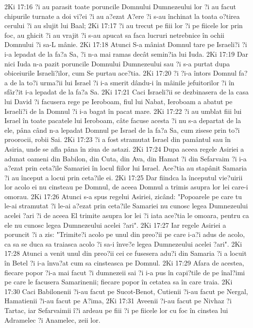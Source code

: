 2Ki 17:16  ?i au parasit toate poruncile Domnului Dumnezeului lor ?i au facut chipurile turnate a doi vi?ei ?i au a?ezat A?ere ?i s-au închinat la toata o?tirea cerului ?i au slujit lui Baal;
2Ki 17:17  ?i au trecut pe fiii lor ?i pe fiicele lor prin foc, au ghicit ?i au vrajit ?i s-au apucat sa faca lucruri netrebnice în ochii Domnului ?i sa-L mânie.
2Ki 17:18  Atunci S-a mâniat Domnul tare pe Israeli?i ?i i-a lepadat de la fa?a Sa, ?i n-a mai ramas decât semin?ia lui Iuda.
2Ki 17:19  Dar nici Iuda n-a pazit poruncile Domnului Dumnezeului sau ?i s-a purtat dupa obiceiurile Israeli?ilor, cum Se purtau ace?tia.
2Ki 17:20  ?i ?i-a întors Domnul fa?a de la to?i urma?ii lui Israel ?i i-a smerit dându-i în mâinile jefuitorilor ?i în sfâr?it i-a lepadat de la fa?a Sa.
2Ki 17:21  Caci Israeli?ii se dezbinasera de la casa lui David ?i facusera rege pe Ieroboam, fiul lui Nabat, Ieroboam a abatut pe Israeli?i de la Domnul ?i i-a bagat în pacat mare.
2Ki 17:22  ?i au umblat fiii lui Israel în toate pacatele lui Ieroboam, câte facuse acesta ?i nu s-a departat de la ele, pâna când n-a lepadat Domnul pe Israel de la fa?a Sa, cum zisese prin to?i proorocii, robii Sai.
2Ki 17:23  ?i a fost stramutat Israel din pamântul sau în Asiria, unde se afla pâna în ziua de astazi.
2Ki 17:24  Dupa aceea regele Asiriei a adunat oameni din Babilon, din Cuta, din Ava, din Hamat ?i din Sefarvaim ?i i-a a?ezat prin ceta?ile Samariei în locul fiilor lui Israel. Ace?tia au stapânit Samaria ?i au început a locui prin ceta?ile ei.
2Ki 17:25  Dar fiindca la începutul vie?uirii lor acolo ei nu cinsteau pe Domnul, de aceea Domnul a trimis asupra lor lei care-i omorau.
2Ki 17:26  Atunci s-a spus regelui Asiriei, zicând: "Popoarele pe care tu le-ai stramutat ?i le-ai a?ezat prin ceta?ile Samariei nu cunosc legea Dumnezeului acelei ?ari ?i de aceea El trimite asupra lor lei ?i iata ace?tia le omoara, pentru ca ele nu cunosc legea Dumnezeului acelei ?ari".
2Ki 17:27  Iar regele Asiriei a poruncit ?i a zis: "Trimite?i acolo pe unul din preo?ii pe care i-a?i adus de acolo, ca sa se duca sa traiasca acolo ?i sa-i înve?e legea Dumnezeului acelei ?ari".
2Ki 17:28  Atunci a venit unul din preo?ii cei ce fusesera adu?i din Samaria ?i a locuit în Betel ?i i-a înva?at cum sa cinsteasca pe Domnul.
2Ki 17:29  Afara de acestea, fiecare popor ?i-a mai facut ?i dumnezeii sai ?i i-a pus în capi?tile de pe înal?imi pe care le facusera Samarinenii; fiecare popor în cetatea sa în care traia.
2Ki 17:30  Caci Babilonenii ?i-au facut pe Sucot-Benot, Cutienii ?i-au facut pe Nergal, Hamatienii ?i-au facut pe A?ima,
2Ki 17:31  Aveenii ?i-au facut pe Nivhaz ?i Tartac, iar Sefarvaimii î?i ardeau pe fiii ?i pe fiicele lor cu foc în cinstea lui Adramelec ?i Anamelec, zeii lor.
